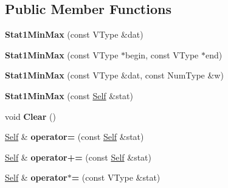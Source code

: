 \subsection*{Public Member Functions}
\begin{DoxyCompactItemize}
\item 
\mbox{\label{classbenchmark_1_1_stat1_min_max_ac26cdf0681e81a117425b8d162a88b3b}} 
{\bfseries Stat1\+Min\+Max} (const V\+Type \&dat)
\item 
\mbox{\label{classbenchmark_1_1_stat1_min_max_a29ff18df79ca4b9ccc500e0d502bb76a}} 
{\bfseries Stat1\+Min\+Max} (const V\+Type $\ast$begin, const V\+Type $\ast$end)
\item 
\mbox{\label{classbenchmark_1_1_stat1_min_max_ac1b1dc98556908098dbc88702570fc79}} 
{\bfseries Stat1\+Min\+Max} (const V\+Type \&dat, const Num\+Type \&w)
\item 
\mbox{\label{classbenchmark_1_1_stat1_min_max_a40a246d0c628e8f0e0734eb02135cd4c}} 
{\bfseries Stat1\+Min\+Max} (const \mbox{\hyperlink{classbenchmark_1_1_stat1}{Self}} \&stat)
\item 
\mbox{\label{classbenchmark_1_1_stat1_min_max_a9fd18d8dbd0ea5df29343f25fc83f072}} 
void {\bfseries Clear} ()
\item 
\mbox{\label{classbenchmark_1_1_stat1_min_max_a2b07899231500a5f3d9250d728e48f4b}} 
\mbox{\hyperlink{classbenchmark_1_1_stat1}{Self}} \& {\bfseries operator=} (const \mbox{\hyperlink{classbenchmark_1_1_stat1}{Self}} \&stat)
\item 
\mbox{\label{classbenchmark_1_1_stat1_min_max_aa0008faf850a22f0dfcdb6a7ea13e7ed}} 
\mbox{\hyperlink{classbenchmark_1_1_stat1}{Self}} \& {\bfseries operator+=} (const \mbox{\hyperlink{classbenchmark_1_1_stat1}{Self}} \&stat)
\item 
\mbox{\label{classbenchmark_1_1_stat1_min_max_a5962d316e7625b0af69e22b3ecb0d1bc}} 
\mbox{\hyperlink{classbenchmark_1_1_stat1}{Self}} \& {\bfseries operator$\ast$=} (const V\+Type \&stat)

\end{DoxyCompactItemize}
